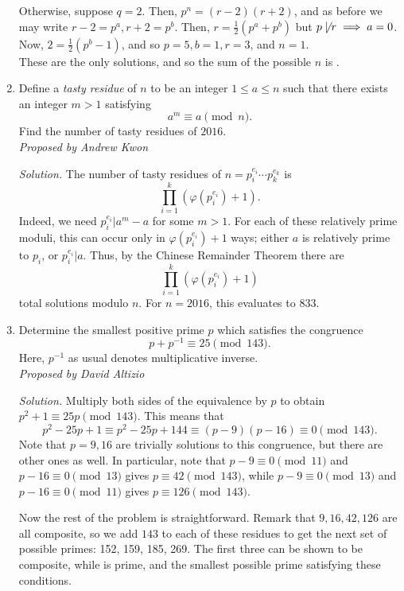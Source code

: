 \documentclass[10pt]{article}
\newcommand{\proposed}[1]
{
\vspace{5pt}
\noindent\textit{Proposed by #1}
}
\newcommand{\solution}
{
\vspace{5pt}
\noindent\textit{Solution.}\qquad
}
\begin{document}
\begin{enumerate}
\par Otherwise, suppose $q = 2$. Then, $p^{n} = (r-2)(r+2)$, and as before we
may write $r-2 = p^{a}, r+2 = p^{b}$. Then, $r = \displaystyle
\frac{1}{2} ( p^{a} + p^{b} )$ but $p \not\mid r \implies a = 0$. Now, $2
=\displaystyle \frac{1}{2} (p^{b} -1)$, and so $ p = 5, b = 1, r = 3$, and $n =
1$. \\

These are the only solutions, and so the sum of the possible $n$ is .

\item Define a \textit{tasty residue} of $n$ to be an integer $1\leq a\leq n$ such that there exists an integer $m>1$ satisfying \[a^m\equiv a\pmod n.\] Find the number of tasty residues of $2016$. \\

\proposed{Andrew Kwon}

\solution The number of tasty residues of $n = p_i^{e_i} \cdots p_k^{e_k}$ is
\[ \prod_{i=1}^k ( \varphi(p_i^{e_i}) + 1) .\]
Indeed, we need $p_i^{e_i} | a^m - a$ for some $m > 1$. For each of these relatively prime moduli, this can occur only in $\varphi(p_i^{e_i}) +1$ ways; either $a$ is relatively prime to $p_i$, or $p_i^{e_i} | a$. Thus, by the Chinese Remainder Theorem there are 
\[ \prod_{i=1}^{k} (\varphi(p_i^{e_i})+1) \]
total solutions modulo $n$. For $n=2016$, this evaluates to $\boxed{833}$.


\item Determine the smallest positive prime $p$ which satisfies the congruence
	\[p+p^{-1}\equiv 25\pmod{143}.\] Here, $p^{-1}$ as usual denotes
	multiplicative inverse. \\%

	\proposed{David Altizio}

	\solution Multiply both sides of the equivalence by $p$ to obtain
	$p^{2} + 1 \equiv 25p \pmod{143}$. This means that
	\[
		p^{2} - 25p + 1 \equiv p^{2} - 25p + 144 \equiv (p-9)(p-16)
		\equiv 0 \pmod{143}.
	\]
	Note that $p=9, 16$ are trivially solutions to this congruence, but
	there are other ones as well. In particular, note that $p-9 \equiv 0
	\pmod{11}$ and $p - 16 \equiv 0 \pmod{13}$ gives $p \equiv 42
	\pmod{143}$, while $p-9 \equiv 0 \pmod{13}$ and $p-16 \equiv 0
	\pmod{11}$ gives $p \equiv 126 \pmod{143}$. 
	\par \noindent Now the rest of the problem is straightforward. Remark
	that $9, 16, 42, 126$ are all composite, so we add $143$ to each of
	these residues to get the next set of possible primes: 152, 159, 185,
	269. The first three can be shown to be composite, while  is
	prime, and the smallest possible prime satisfying these conditions.


\end{enumerate}
\end{document}
